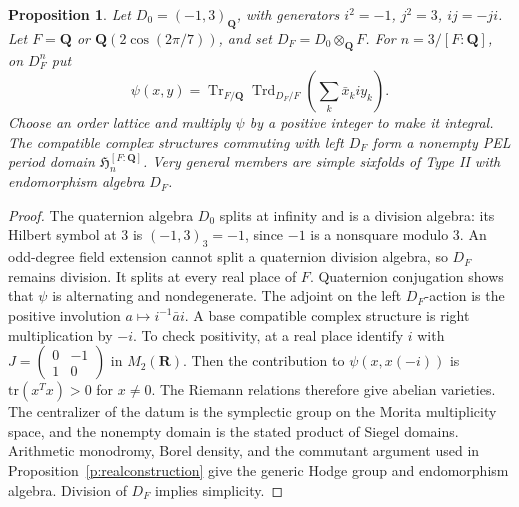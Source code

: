 \documentclass[10pt,reqno]{article}
\theoremstyle{emphasizedplain}
\theoremstyle{emphasizeddefinition}
\theoremstyle{emphasizeddefinition}
\newtheorem{preproposition}[prelemma]{Proposition}
\DeclareMathOperator{\Tr}{Tr}
\DeclareMathOperator{\Trd}{Trd}
\newcommand{\Q}{\mathbf Q}
\newcommand{\R}{\mathbf R}
\begin{document}
\begin{preproposition}\label{p:quaternionconstruction}
Let $D_0=(-1,3)_\Q$, with generators $i^2=-1$, $j^2=3$, $ij=-ji$.
Let $F=\Q$ or $\Q(2\cos(2\pi/7))$, and set $D_F=D_0\otimes_\Q F$.
For $n=3/[F:\Q]$, on $D_F^n$ put
\[
 \psi(x,y)=\Tr_{F/\Q}\Trd_{D_F/F}\left(\sum_k\bar x_k i y_k\right).
\]
Choose an order lattice and multiply $\psi$ by a positive integer to make
it integral. The compatible complex structures commuting with left $D_F$
form a nonempty PEL period domain $\mathfrak H_n^{[F:\Q]}$. Very general
members are simple sixfolds of Type II with endomorphism algebra $D_F$.
\end{preproposition}
\begin{proof}
The quaternion algebra $D_0$ splits at infinity and is a division algebra:
its Hilbert symbol at $3$ is $(-1,3)_3=-1$, since $-1$ is a nonsquare modulo
$3$. An odd-degree field extension cannot split a quaternion division
algebra, so $D_F$ remains division. It splits at every real place of $F$.
Quaternion conjugation shows that $\psi$ is alternating and nondegenerate.
The adjoint on the left $D_F$-action is the positive involution
$a\mapsto i^{-1}\bar a i$. A base compatible complex structure is right
multiplication by $-i$. To check positivity, at a real place identify
$i$ with $J=\left(\begin{smallmatrix}0&-1\\1&0\end{smallmatrix}\right)$
in $M_2(\R)$. Then the contribution to $\psi(x,x(-i))$ is
$\mathrm{tr}(x^T x)>0$ for $x\ne0$.
The Riemann relations therefore give abelian varieties. The centralizer of
the datum is the symplectic group on the Morita multiplicity space, and the
nonempty domain is the stated product of Siegel domains.
Arithmetic monodromy, Borel density, and the commutant argument used in
Proposition~\ref{p:realconstruction} give the generic Hodge group and
endomorphism algebra. Division of $D_F$ implies simplicity.
\end{proof}
\end{document}
